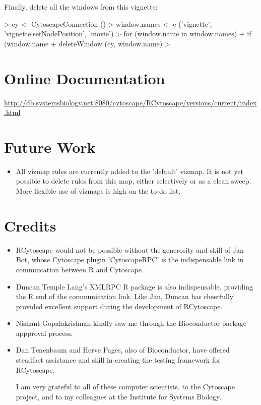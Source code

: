 \documentclass[12pt]{article}
\begin{document}
Finally, delete all the windows from this vignette:

\begin{Schunk}
\begin{Sinput}
>   cy <- CytoscapeConnection ()
>   window.names <- c ('vignette', 'vignette.setNodePosition', 'movie')
>   for (window.name in window.names)
+     if (window.name %in% as.character (getWindowList (cy)))
+       deleteWindow (cy, window.name)
> 
\end{Sinput}
\end{Schunk}
\section{Online Documentation}

 \url{http://db.systemsbiology.net:8080/cytoscape/RCytoscape/versions/current/index.html}


\section{Future Work}

\begin{itemize}

\item All vizmap rules are currently added to the 'default' vizmap.  It is not yet possible to delete rules from this map, either selectively or as a clean sweep.  More flexible use of vizmaps is high on the to-do list.

\end{itemize}

\section{Credits}



\begin{itemize}

\item RCytoscape would not be possible without the generosity and skill of Jan Bot, whose Cytoscape plugin 'CytoscapeRPC' is the indispensable link in commuication between R and Cytoscape.

\item Duncan Temple Lang's XMLRPC R package is also indispensable, providing the R end of the communication link.  Like Jan, Duncan has cheerfully provided excellent support during the development of RCytoscape.

\item Nishant Gopalakrishnan kindly saw me through the Bioconductor package appproval process.  

\item Dan Tenenbaum and Herve Pages, also of Bioconductor, have offered steadfast assistance and skill in creating the testing framework for RCytoscape.


I am very grateful to all of these computer scientists, to the Cytoscape project, and to my colleagues at the Institute for Systems Biology.

\end{itemize}
\end{document}

